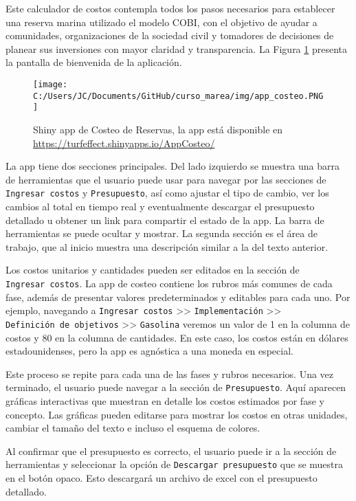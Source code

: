 \documentclass[]{krantz}
\begin{document}
Este calculador de costos contempla todos los pasos necesarios para
establecer una reserva marina utilizado el modelo COBI, con el objetivo
de ayudar a comunidades, organizaciones de la sociedad civil y tomadores
de decisiones de planear sus inversiones con mayor claridad y
transparencia. La Figura \ref{fig:shiny-costeo} presenta la pantalla de
bienvenida de la aplicación.

\begin{figure}
\centering
\texttt{[image: C:/Users/JC/Documents/GitHub/curso\_marea/img/app\_costeo.PNG]}
\caption{\label{fig:shiny-costeo}Shiny app de Costeo de Reservas, la app
está disponible en \url{https://turfeffect.shinyapps.io/AppCosteo/}}
\end{figure}

La app tiene dos secciones principales. Del lado izquierdo se muestra
una barra de herramientas que el usuario puede usar para navegar por las
secciones de \texttt{Ingresar\ costos} y \texttt{Presupuesto}, así como
ajustar el tipo de cambio, ver los cambios al total en tiempo real y
eventualmente descargar el presupuesto detallado u obtener un link para
compartir el estado de la app. La barra de herramientas se puede ocultar
y mostrar. La segunda sección es el área de trabajo, que al inicio
muestra una descripción similar a la del texto anterior.

Los costos unitarios y cantidades pueden ser editados en la sección de
\texttt{Ingresar\ costos}. La app de costeo contiene los rubros más
comunes de cada fase, además de presentar valores predeterminados y
editables para cada uno. Por ejemplo, navegando a
\texttt{Ingresar\ costos} \textgreater{}\textgreater{}
\texttt{Implementación} \textgreater{}\textgreater{}
\texttt{Definición\ de\ objetivos} \textgreater{}\textgreater{}
\texttt{Gasolina} veremos un valor de 1 en la columna de costos y 80 en
la columna de cantidades. En este caso, los costos están en dólares
estadounidenses, pero la app es agnóstica a una moneda en especial.

Este proceso se repite para cada una de las fases y rubros necesarios.
Una vez terminado, el usuario puede navegar a la sección de
\texttt{Presupuesto}. Aquí aparecen gráficas interactivas que muestran
en detalle los costos estimados por fase y concepto. Las gráficas pueden
editarse para mostrar los costos en otras unidades, cambiar el tamaño
del texto e incluso el esquema de colores.

Al confirmar que el presupuesto es correcto, el usuario puede ir a la
sección de herramientas y seleccionar la opción de
\texttt{Descargar\ presupuesto} que se muestra en el botón opaco. Esto
descargará un archivo de excel con el presupuesto detallado.
\end{document}
